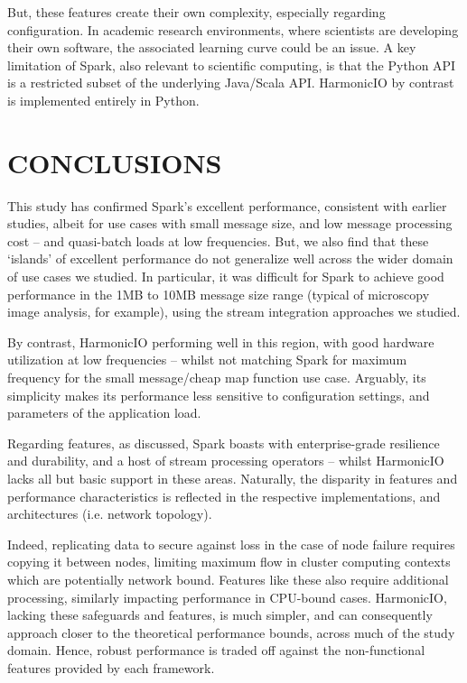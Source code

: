 \documentclass[conference]{IEEEtran}
\begin{document}
But, these features create their own complexity, especially regarding configuration. In academic research environments, where scientists are developing their own software, the associated learning curve could be an issue. A key limitation of Spark, also relevant to scientific computing, is that the Python API is a restricted subset of the underlying Java/Scala API. HarmonicIO by contrast is implemented entirely in Python.


\section{CONCLUSIONS}\label{conc}
This study has confirmed Spark's excellent performance, consistent with earlier studies, albeit for use cases with small message size, and low message processing cost -- and quasi-batch loads at low frequencies. But, we also find that these `islands' of excellent performance do not generalize well across the wider domain of use cases we studied. In particular, it was difficult for Spark to achieve good performance in the 1MB to 10MB message size range (typical of microscopy image analysis, for example), using the stream integration approaches we studied. 

By contrast, HarmonicIO performing well in this region, with good hardware utilization at low frequencies -- whilst not matching Spark for maximum frequency for the small message/cheap map function use case. Arguably, its simplicity makes its performance less sensitive to configuration settings, and parameters of the application load. 

Regarding features, as discussed, Spark boasts with enterprise-grade resilience and durability, and a host of stream processing operators -- whilst HarmonicIO lacks all but basic support in these areas. 
Naturally, the disparity in features and performance characteristics is reflected in the respective implementations, and architectures (i.e. network topology).  

Indeed, replicating data to secure against loss in the case of node failure requires copying it between nodes, limiting maximum flow in cluster computing contexts which are potentially network bound.
Features like these also require additional processing, similarly impacting performance in CPU-bound cases. HarmonicIO, lacking these safeguards and features, is much simpler, and can consequently approach closer to the theoretical performance bounds, across much of the study domain. Hence, robust performance is traded off against the non-functional features provided by each framework.
\end{document}
